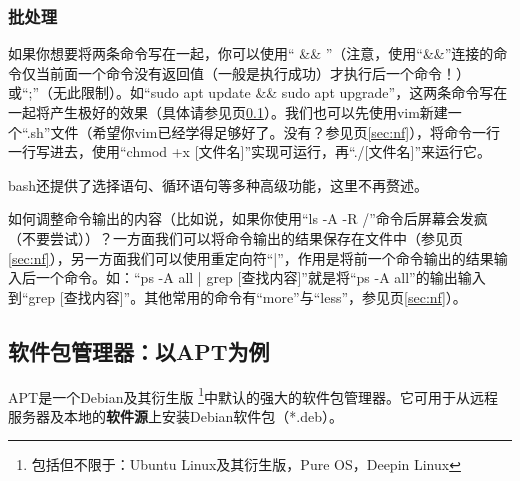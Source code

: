\documentclass{book}
\begin{document}
\subsubsection{批处理}
\label{sec:bat}如果你想要将两条命令写在一起，你可以使用“ \&\& ”（注意，使用“\&\&”连接的命令仅当前面一个命令没有返回值（一般是执行成功）才执行后一个命令！）或“;”（无此限制）。如“sudo apt update \&\& sudo apt upgrade”，这两条命令写在一起将产生极好的效果（具体请参见\pageref{sec:apt}页\ref{sec:apt}）。我们也可以先使用vim新建一个“.sh”文件（希望你vim已经学得足够好了。没有？参见\pageref{sec:nf}页\ref{sec:nf}），将命令一行一行写进去，使用“chmod +x [文件名]”实现可运行，再“./[文件名]”来运行它。\par
bash还提供了选择语句、循环语句等多种高级功能，这里不再赘述。\par
如何调整命令输出的内容（比如说，如果你使用“ls -A -R /”命令后屏幕会发疯（不要尝试））？一方面我们可以将命令输出的结果保存在文件中（参见\pageref{sec:nf}页\ref{sec:nf}），另一方面我们可以使用重定向符“|”，作用是将前一个命令输出的结果输入后一个命令。如：“ps -A  all | grep [查找内容]”就是将“ps -A all”的输出输入到“grep [查找内容]”。其他常用的命令有“more”与“less”，参见\pageref{sec:nf}页\ref{sec:nf}）。
\subsection{软件包管理器：以APT为例}
\label{sec:apt}APT是一个Debian及其衍生版 \footnote{包括但不限于：Ubuntu Linux及其衍生版，Pure OS，Deepin Linux}中默认的强大的软件包管理器。它可用于从远程服务器及本地的\textbf{软件源}上安装Debian软件包（*.deb）。
\end{document}
